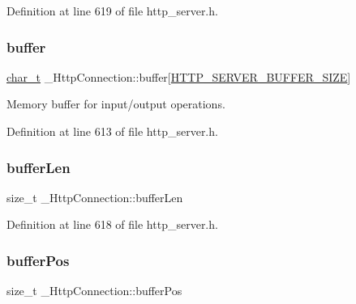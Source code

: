 Definition at line 619 of file http\+\_\+server.\+h.

\mbox{\label{struct__HttpConnection_ac60f169d3523795b71f8082a35412acb}} 
\subsubsection{\texorpdfstring{buffer}{buffer}}
{\footnotesize\ttfamily \hyperlink{compiler__port_8h_a40bb5262bf908c328fbcfbe5d29d0201}{char\+\_\+t} \+\_\+\+Http\+Connection\+::buffer\mbox{[}\hyperlink{http__server_8h_a7323ad0fee234d179bd1f679496174d2}{H\+T\+T\+P\+\_\+\+S\+E\+R\+V\+E\+R\+\_\+\+B\+U\+F\+F\+E\+R\+\_\+\+S\+I\+ZE}\mbox{]}}



Memory buffer for input/output operations. 



Definition at line 613 of file http\+\_\+server.\+h.

\mbox{\label{struct__HttpConnection_a236795607df80bee3a6a1b50d49e821d}} 
\subsubsection{\texorpdfstring{buffer\+Len}{bufferLen}}
{\footnotesize\ttfamily size\+\_\+t \+\_\+\+Http\+Connection\+::buffer\+Len}



Definition at line 618 of file http\+\_\+server.\+h.

\mbox{\label{struct__HttpConnection_ad23b22bb32213e63e03b7079e0cdbf03}} 
\subsubsection{\texorpdfstring{buffer\+Pos}{bufferPos}}
{\footnotesize\ttfamily size\+\_\+t \+\_\+\+Http\+Connection\+::buffer\+Pos}



